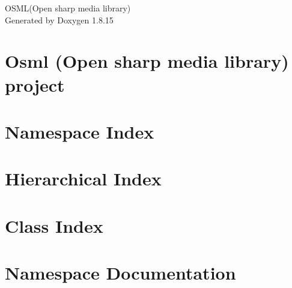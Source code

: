 \let\mypdfximage\pdfximage\def\pdfximage{\immediate\mypdfximage}\documentclass[twoside]{book}
\newcommand{\+}{\discretionary{\mbox{\scriptsize$\hookleftarrow$}}{}{}}
\newcommand{\clearemptydoublepage}{%
  \newpage{\pagestyle{empty}\cleardoublepage}%
}
\begin{document}
\hypersetup{pageanchor=false,
             bookmarksnumbered=true,
             pdfencoding=unicode
            }
\begin{titlepage}
\vspace*{7cm}
\begin{center}%
{\Large O\+S\+ML(Open sharp media library) }\\
\vspace*{1cm}
{\large Generated by Doxygen 1.8.15}\\
\end{center}
\end{titlepage}
\clearemptydoublepage
{}
\tableofcontents
\clearemptydoublepage
{}
\hypersetup{pageanchor=true}

\chapter{Osml (Open sharp media library) project}
\label{md__home_dev_osml_README}

\chapter{Namespace Index}

\chapter{Hierarchical Index}

\chapter{Class Index}

\chapter{Namespace Documentation}























\end{document}
